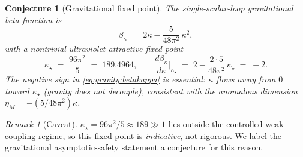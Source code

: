 \documentclass[11pt]{article}
\theoremstyle{plain}
\newtheorem{conjecture}[theorem]{Conjecture}
\theoremstyle{definition}
\theoremstyle{remark}
\newtheorem{remark}[theorem]{Remark}
\begin{document}
\begin{conjecture}[Gravitational fixed point]
\label{conj:gravity:as}
\label{sec:gravity:as}
\label{sec:gravity:AS}
The single-scalar-loop gravitational beta function is
\begin{equation}\label{eq:gravity:betakappa}
  \beta_{\kappa} \;=\; 2\kappa - \frac{5}{48\pi^{2}}\,\kappa^{2},
\end{equation}
with a nontrivial ultraviolet-attractive fixed point
\begin{equation}\label{eq:gravity:kappastar}
  \kappa_{\star} \;=\; \frac{96\pi^{2}}{5} \;=\; 189.4964,
  \qquad
  \frac{d\beta_{\kappa}}{d\kappa}\Big|_{\kappa_{\star}}
  \;=\; 2 - \frac{2\cdot 5}{48\pi^{2}}\,\kappa_{\star}
  \;=\; -2 .
\end{equation}
The negative sign in \eqref{eq:gravity:betakappa} is essential: $\kappa$
flows \emph{away} from $0$ toward $\kappa_{\star}$ (gravity does \emph{not}
decouple), consistent with the anomalous dimension
$\eta_{M}=-(5/48\pi^{2})\kappa$.
\end{conjecture}

\begin{remark}[Caveat]
\label{rmk:gravity:caveat}
$\kappa_{\star}=96\pi^{2}/5\approx 189\gg 1$ lies outside the controlled
weak-coupling regime, so this fixed point is \emph{indicative}, not
rigorous. We label the gravitational asymptotic-safety statement a
conjecture for this reason.
\end{remark}
\end{document}

